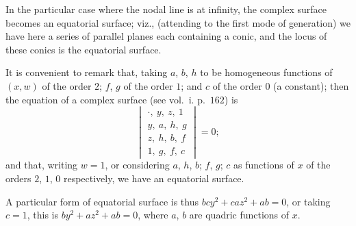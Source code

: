 \documentclass[11pt,a4paper]{article}
\begin{document}
\medskip

In the particular case where the nodal line is at infinity, the complex
surface becomes an equatorial surface; viz., (attending to the first mode
of generation) we have here a series of parallel planes each containing a
conic, and the locus of these conics is the equatorial surface.

\medskip

It is convenient to remark that, taking $a$, $b$, $h$ to be homogeneous
functions of $(x, w)$ of the order $2$; $f$, $g$ of the order $1$; and
$c$ of the order $0$ (a constant); then the equation of a complex surface
(see vol.~i. p.~$162$) is
\[
\begin{vmatrix}
\cdot,\ y,\ z,\ 1 \\
y,\ a,\ h,\ g \\
z,\ h,\ b,\ f \\
1,\ g,\ f,\ c
\end{vmatrix}
= 0;
\]
and that, writing $w = 1$, or considering $a$, $h$, $b$; $f$, $g$; $c$
as functions of $x$ of the orders $2$, $1$, $0$ respectively, we have an
equatorial surface.

A particular form of equatorial surface is thus
$b c y^2 + c a z^2 + ab = 0$, or taking $c = 1$, this is
$b y^2 + a z^2 + ab = 0$, where $a$, $b$ are quadric functions of $x$.

\medskip
\end{document}
